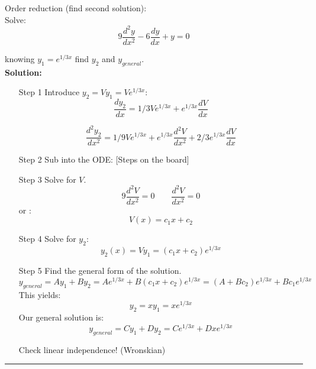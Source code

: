 \begin{exmp}{Order reduction (find second solution):}\\
Solve:
\begin{equation}
9\frac{d^2y}{dx^2}-6\frac{dy}{dx} + y=0
\end{equation}

knowing $y_1=e^{1/3 x}$ find $y_2$ and $y_{general}$.\\
\textbf{Solution:}
\begin{itemize}
\item[Step 1] Introduce $y_2=Vy_1=Ve^{1/3 x}$:
\begin{equation*}
\frac{dy_2}{dx}=1/3 Ve^{1/3x}+e^{1/3x}\frac{dV}{dx}
\end{equation*}

\begin{equation*}
\frac{d^2y_2}{dx^2}=1/9 Ve^{1/3x} +  e^{1/3x}\frac{d^2V}{dx^2}+2/3 e^{1/3x} \frac{dV}{dx}
\end{equation*}
\item[Step 2] Sub into the ODE:
[Steps on the board]

\item[Step 3] Solve for $V$.
\begin{equation*}
{9\frac{d^2V}{dx^2}=0} \qquad \boxed{\frac{d^2V}{dx^2}=0}
\end{equation*}
or :
\begin{equation*}
V(x)=c_1x+c_2
\end{equation*}
\item[Step 4] Solve for $y_2$:
\begin{equation*}
y_2(x)=Vy_1=(c_1x+c_2)e^{1/3x}
\end{equation*}
\item[Step 5] Find the general form of the solution.\\
\begin{equation*}
y_{general} = Ay_1+By_2=Ae^{1/3x} +B(c_1x+c_2)e^{1/3x}=(A+Bc_2)e^{1/3x}+Bc_1e^{1/3x}
\end{equation*}
This yields:
\begin{equation*}
\boxed{y_2= xy_1 = xe^{1/3x}}
\end{equation*}
Our general solution is:
\begin{equation*}
\boxed{y_{general} = Cy_1+Dy_2=Ce^{1/3x}+Dxe^{1/3x}}
\end{equation*}

Check linear independence! (Wronskian)
\end{itemize}

\end{exmp}


\begin{center}
\noindent\rule{4cm}{0.4pt}
\end{center}



